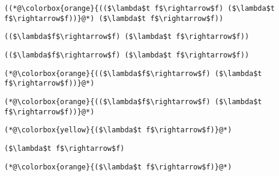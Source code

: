 \documentclass{beamer}
\begin{document}
\begin{frame}[fragile]{\CurrentSection}
\lstset{basicstyle=\ttfamily\small}\lstset{numbers=none}\lstset{language=ML}\begin{lstlisting}
((*@\colorbox{orange}{(($\lambda$t f$\rightarrow$f) ($\lambda$t f$\rightarrow$f))}@*) ($\lambda$t f$\rightarrow$f))
\end{lstlisting}
\pause\lstset{language=ML}\begin{lstlisting}
(($\lambda$f$\rightarrow$f) ($\lambda$t f$\rightarrow$f))
\end{lstlisting}

\end{frame}

\begin{frame}[fragile]{\CurrentSection}
\lstset{basicstyle=\ttfamily\small}\lstset{numbers=none}\lstset{language=ML}\begin{lstlisting}
(($\lambda$f$\rightarrow$f) ($\lambda$t f$\rightarrow$f))
\end{lstlisting}
\pause\lstset{language=ML}\begin{lstlisting}
(*@\colorbox{orange}{(($\lambda$f$\rightarrow$f) ($\lambda$t f$\rightarrow$f))}@*)
\end{lstlisting}

\end{frame}

\begin{frame}[fragile]{\CurrentSection}
\lstset{basicstyle=\ttfamily\small}\lstset{numbers=none}\lstset{language=ML}\begin{lstlisting}
(*@\colorbox{orange}{(($\lambda$f$\rightarrow$f) ($\lambda$t f$\rightarrow$f))}@*)
\end{lstlisting}
\pause\lstset{language=ML}\begin{lstlisting}
(*@\colorbox{yellow}{($\lambda$t f$\rightarrow$f)}@*)
\end{lstlisting}

\end{frame}

\begin{frame}[fragile]{\CurrentSection}
\lstset{basicstyle=\ttfamily\small}\lstset{numbers=none}\lstset{language=ML}\begin{lstlisting}
($\lambda$t f$\rightarrow$f)
\end{lstlisting}
\pause\lstset{language=ML}\begin{lstlisting}
(*@\colorbox{orange}{($\lambda$t f$\rightarrow$f)}@*)
\end{lstlisting}

\end{frame}
\end{document}
